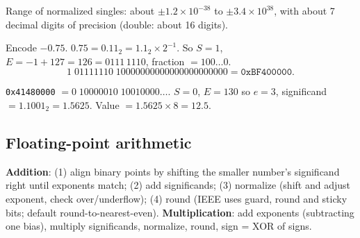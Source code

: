 Range of normalized singles: about $\pm 1.2 \times 10^{-38}$ to
$\pm 3.4 \times 10^{38}$, with about 7 decimal digits of precision
(double: about 16 digits).

\begin{example}
Encode $-0.75$. $0.75 = 0.11_2 = 1.1_2 \times 2^{-1}$. So $S = 1$,
$E = -1 + 127 = 126 = 0111\,1110$, fraction $= 100\ldots0$.
\[
1\;01111110\;10000000000000000000000 = \texttt{0xBF400000}.
\]

\begin{center}
\end{center}
\end{example}

\begin{example}
\texttt{0x41480000} $= 0\;10000010\;10010000\ldots$. $S = 0$, $E = 130$ so
$e = 3$, significand $= 1.1001_2 = 1.5625$. Value $= 1.5625 \times 8 = 12.5$.
\end{example}

\subsection{Floating-point arithmetic}

\textbf{Addition}: (1) align binary points by shifting the smaller number's
significand right until exponents match; (2) add significands; (3) normalize
(shift and adjust exponent, check over/underflow); (4) round (IEEE uses
guard, round and sticky bits; default round-to-nearest-even).
\textbf{Multiplication}: add exponents (subtracting one bias), multiply
significands, normalize, round, sign = XOR of signs.

